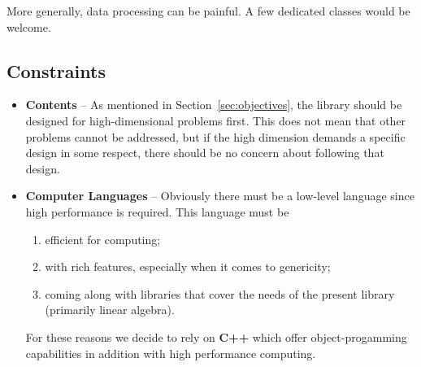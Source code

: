 \documentclass{tufte-book}
\begin{document}
More generally, data processing can be painful. A few dedicated classes would
be welcome.


\subsection{Constraints}

\begin{itemize}
\item \textbf{Contents} -- As mentioned in Section~\ref{sec:objectives}, the library should be designed for
high-dimensional problems first. This does not mean that other problems cannot
be addressed, but if the high dimension demands a specific design in some
respect, there should be no concern about following that design.

\item \textbf{Computer Languages} -- Obviously there must be a low-level language since high performance is
required. This language must be
\begin{enumerate}
\item efficient for computing;
\item with rich features, especially when it comes to genericity;
\item coming along with libraries that cover the needs of the present library
 (primarily linear algebra).
\end{enumerate}
For these reasons we decide to rely on \textbf{C++} which offer object-progamming
capabilities in addition with high performance computing.


\end{itemize}
\end{document}

